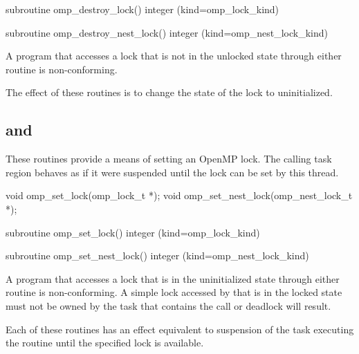 \fortranspecificstart
\begin{boxedcode}
subroutine omp\_destroy\_lock()
integer (kind=omp\_lock\_kind) 

subroutine omp\_destroy\_nest\_lock()
integer (kind=omp\_nest\_lock\_kind) 
\end{boxedcode}
\fortranspecificend

\constraints
A program that accesses a lock that is not in the unlocked state through either routine is 
non-conforming.

\effect
The effect of these routines is to change the state of the lock to uninitialized.










\subsection{ and }
\label{subsec:omp_set_lock and omp_set_nest_lock}
\summary
These routines provide a means of setting an OpenMP lock. The calling
task region behaves as if it were suspended until the lock can be set
by this thread.

\format
\ccppspecificstart
\begin{boxedcode}
void omp\_set\_lock(omp\_lock\_t *);
void omp\_set\_nest\_lock(omp\_nest\_lock\_t *);
\end{boxedcode}
\ccppspecificend

\fortranspecificstart
\begin{boxedcode}
subroutine omp\_set\_lock()
integer (kind=omp\_lock\_kind) 

subroutine omp\_set\_nest\_lock()
integer (kind=omp\_nest\_lock\_kind) 
\end{boxedcode}
\fortranspecificend

\constraints
A program that accesses a lock that is in the uninitialized state through either routine is 
non-conforming. A simple lock accessed by  that is in the locked state 
must not be owned by the task that contains the call or deadlock will result.

\effect
Each of these routines has an effect equivalent to suspension of the task
executing the routine until the specified lock is available. 

